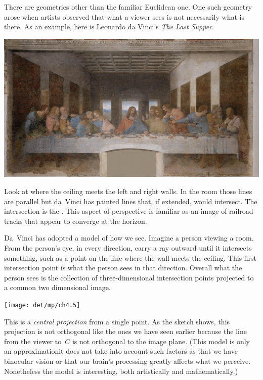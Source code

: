 There are geometries other than the familiar Euclidean one.
One such geometry arose when artists observed
that what a viewer sees is not necessarily what is there.
As an example, here is Leonardo da Vinci's 
\textit{The Last Supper}.
\begin{center} 
  \includegraphics[width=.6\textwidth]{det/pix/LastSupper.jpg}
\end{center}
Look at where the ceiling meets the left and right walls.
In the room those lines are parallel but 
da~Vinci has painted lines that, if extended, would intersect.
The intersection is the 
.
This aspect of perspective is familiar as an image of 
railroad tracks that appear to converge at the horizon.

Da~Vinci has adopted a model of how we see.
Imagine a person viewing a room.
From the person's eye, in every direction,
carry a ray outward until it intersects something, such
as a point on the line where the wall meets the ceiling.
This first intersection point is what the person sees in that direction.
Overall what the person sees is the collection of three-dimensional
intersection points
projected to a common two dimensional image. 
\begin{center}
  \texttt{[image: det/mp/ch4.5]}
\end{center}
This is a 
\emph{central projection} 
from a single point.
As the sketch shows, this projection is not orthogonal
like the ones we have seen earlier 
because the line
from the viewer to~$C$ is not orthogonal to the image plane.
(This model is only an approximation\Dash it does not take into
account such factors as
that we have binocular vision or that our brain's processing 
greatly affects what we perceive. 
Nonetheless the model is interesting,
both artistically and mathematically.)

